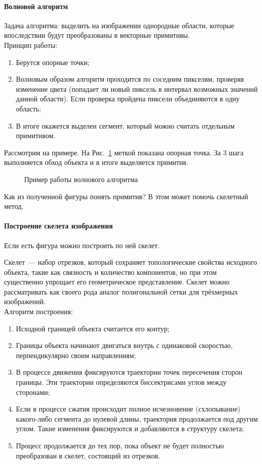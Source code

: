 \paragraph{Волновой алгоритм}
Задача алгоритма: выделить на изображении однородные области, которые впоследствии будут преобразованы в векторные примитивы.
\\

Принцип работы:
\begin{enumerate}
    \item Берутся опорные точки;
    \item Волновым образом алгоритм проходится по соседним пикселям, проверяя изменение цвета (попадает ли новый пиксель в интервал возможных значений данной области). Если проверка пройдена пиксели объединяются в одну область;
    \item В итоге окажется выделен сегмент, который можно считать отдельным примитивом.
\end{enumerate}

Рассмотрим на примере. На Рис.~\ref{fig:line} меткой показана опорная точка. За 3 шага выполняется обход объекта и в итоге выделяется примитив.

\begin{figure}[h]
    \centering
    
    \caption{Пример работы волнового алгоритма}
    \label{fig:line}
\end{figure}

Как из полученной фигуры понять примитив? В этом может помочь скелетный метод.

\paragraph{Построение скелета изображения}
Если есть фигура можно построить по ней скелет.

Скелет~--- набор отрезков, который сохраняет топологические свойства исходного объекта, такие как связность и количество компонентов, но при этом существенно упрощает его геометрическое представление. Скелет можно рассматривать как своего рода аналог полигональной сетки для трёхмерных изображений.
\\

Алгоритм построения:
\begin{enumerate}
    \item Исходной границей объекта считается его контур;
    \item Границы объекта начинают двигаться внутрь с одинаковой скоростью, перпендикулярно своим направлениям;
    \item В процессе движения фиксируются траектории точек пересечения сторон границы. Эти траектории определяются биссектрисами углов между сторонами;
    \item Если в процессе сжатия происходит полное исчезновение (схлопывание) какого-либо сегмента до нулевой длины, траектория продолжается под другим углом. Такие изменения фиксируются и добавляются в структуру скелета;
    \item Процесс продолжается до тех пор, пока объект не будет полностью преобразован в скелет, состоящий из отрезков.
\end{enumerate}

